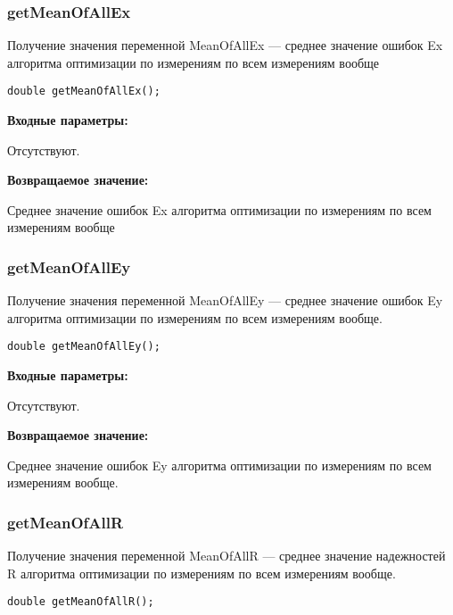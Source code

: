 \documentclass[a4paper,12pt]{article}
\begin{document}
\subsubsection{getMeanOfAllEx}\label{getMeanOfAllEx}

Получение значения переменной MeanOfAllEx --- среднее значение ошибок Ex алгоритма оптимизации по измерениям по всем измерениям вообще


\begin{lstlisting}[label=code_syntax_getMeanOfAllEx,caption=Синтаксис]
double getMeanOfAllEx();
\end{lstlisting}

\textbf{Входные параметры:}

Отсутствуют.

\textbf{Возвращаемое значение:}

Среднее значение ошибок Ex алгоритма оптимизации по измерениям по всем измерениям вообще


\subsubsection{getMeanOfAllEy}\label{getMeanOfAllEy}

Получение значения переменной MeanOfAllEy --- среднее значение ошибок Ey алгоритма оптимизации по измерениям по всем измерениям вообще.


\begin{lstlisting}[label=code_syntax_getMeanOfAllEy,caption=Синтаксис]
double getMeanOfAllEy();
\end{lstlisting}

\textbf{Входные параметры:}

Отсутствуют.

\textbf{Возвращаемое значение:}

Среднее значение ошибок Ey алгоритма оптимизации по измерениям по всем измерениям вообще.


\subsubsection{getMeanOfAllR}\label{getMeanOfAllR}

Получение значения переменной MeanOfAllR --- среднее значение надежностей R алгоритма оптимизации по измерениям по всем измерениям вообще.


\begin{lstlisting}[label=code_syntax_getMeanOfAllR,caption=Синтаксис]
double getMeanOfAllR();
\end{lstlisting}
\end{document}
